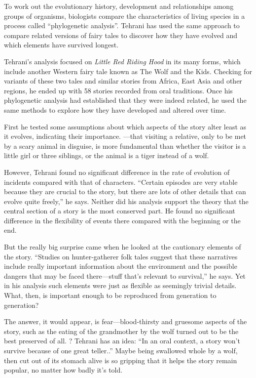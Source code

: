 \documentclass{exam-zh}
\begin{document}
To work out the evolutionary history, development and relationships among groups of organisms, biologists compare the characteristics of living species in a process called ``phylogenetic analysis''. Tehrani has used the same approach to compare related versions of fairy tales to discover how they have evolved and which elements have survived longest.

Tehrani's analysis focused on \textit{Little Red Riding Hood} in its many forms, which include another Western fairy tale known as The Wolf and the Kids. Checking for variants of these two tales and similar stories from Africa, East Asia and other regions, he ended up with 58 stories recorded from oral traditions. Once his phylogenetic analysis had established that they were indeed related, he used the same methods to explore how they have developed and altered over time.

First he tested some assumptions about which aspects of the story alter least as it evolves, indicating their importance. \fillin[D]—that visiting a relative, only to be met by a scary animal in disguise, is more fundamental than whether the visitor is a little girl or three siblings, or the animal is a tiger instead of a wolf.

However, Tehrani found no significant difference in the rate of evolution of incidents compared with that of characters. ``Certain episodes are very stable because they are crucial to the story, but there are lots of other details that can evolve quite freely,'' he says. Neither did his analysis support the theory that the central section of a story is the most conserved part. He found no significant difference in the flexibility of events there compared with the beginning or the end.

But the really big surprise came when he looked at the cautionary elements of the story. ``Studies on hunter-gatherer folk tales suggest that these narratives include really important information about the environment and the possible dangers that may be faced there—stuff that's relevant to survival,'' he says. Yet in his analysis such elements were just as flexible as seemingly trivial details. What, then, is important enough to be reproduced from generation to generation?

The answer, it would appear, is fear—blood-thirsty and gruesome aspects of the story, such as the eating of the grandmother by the wolf turned out to be the best preserved of all. \fillin[B]? Tehrani has an idea: ``In an oral context, a story won't survive because of one great teller.\linebreak \fillin[C].'' Maybe being swallowed whole by a wolf, then cut out of its stomach alive is so gripping that it helps the story remain popular, no matter how badly it's told.
\end{document}
